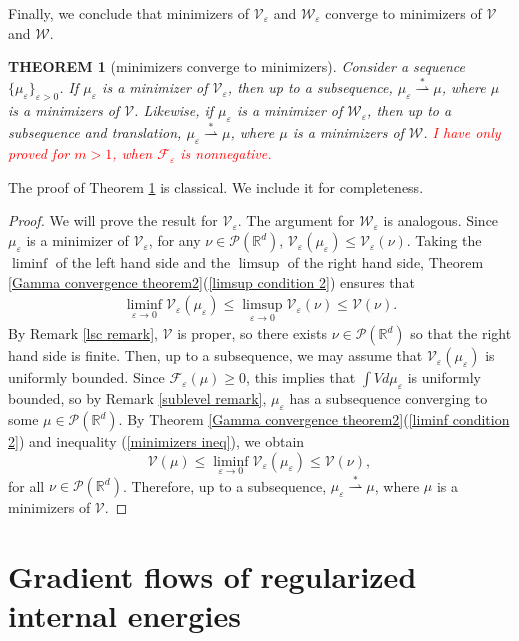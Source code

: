 \documentclass[11pt,leqno]{amsart}
\newtheorem{thm}{THEOREM}[section]
\theoremstyle{definition}
\newcommand{\Rd}{{\mathord{\mathbb R}^d}}
\newcommand{\wsto}{\stackrel{*}{\rightharpoonup}}
\newcommand{\F}{\mathcal{F}}
\def\P{{\mathcal P}}
\def\e{\varepsilon}
\def\F{\mathcal{F}}
\begin{document}
Finally, we conclude that minimizers of $\mathcal{V}_\e$ and $\mathcal{W}_\e$ converge to minimizers of $\mathcal{V}$ and $\mathcal{W}$.

\begin{thm}[minimizers converge to minimizers] \label{minimizers converge theorem}
Consider a sequence $\{ \mu_\e\}_{\e >0}$. If $ \mu_\e$ is a minimizer of $\mathcal{V}_\e$, then up to a subsequence, $\mu_\e \wsto \mu$, where $\mu$ is a minimizers of $\mathcal{V}$. Likewise, if $\mu_\e$ is a minimizer of $\mathcal{W}_\e$, then up to a subsequence and translation, $\mu_\e \wsto \mu$, where $\mu$ is a minimizers of $\mathcal{W}$. \textcolor{red}{I have only proved for $m>1$, when $\F_\e$ is nonnegative.}
\end{thm}
 
 The proof of Theorem \ref{minimizers converge theorem} is classical. We include it for completeness.

\begin{proof}
We will prove the result for $\mathcal{V}_\e$. The argument for $\mathcal{W}_\e$ is analogous. Since $\mu_\e$ is a minimizer of $\mathcal{V}_\e$, for any $\nu \in \P(\Rd)$, $\mathcal{V}_\e(\mu_\e) \leq \mathcal{V}_\e(\nu)$. Taking the $\liminf$ of the left hand side and the $\limsup$ of the right hand side, Theorem \ref{Gamma convergence theorem2}(\ref{limsup condition 2}) ensures that 
\begin{align} \label{minimizers ineq}
 \liminf_{\e \to 0} \mathcal{V}_\e(\mu_\e) \leq \limsup_{\e \to 0} \mathcal{V}_\e(\nu) \leq \mathcal{V}(\nu) . 
 \end{align}
By Remark \ref{lsc remark}, $\mathcal{V}$ is proper, so there exists $\nu \in \P(\Rd)$ so that the right hand side is finite. Then, up to a subsequence, we may assume that $ \mathcal{V}_\e(\mu_\e)$ is uniformly bounded. Since $\F_\e(\mu) \geq 0$, this implies that $\int V d \mu_\e$ is uniformly bounded, so by Remark \ref{sublevel remark}, $\mu_\e$ has a subsequence converging to some $\mu \in \P(\Rd)$. By Theorem \ref{Gamma convergence theorem2}(\ref{liminf condition 2}) and inequality (\ref{minimizers ineq}), we obtain
\[ \mathcal{V}(\mu) \leq  \liminf_{\e \to 0} \mathcal{V}_\e(\mu_\e) \leq \mathcal{V}(\nu) ,
\]
for all $\nu \in \P(\Rd)$. Therefore, up to a subsequence, $\mu_\e \wsto \mu$, where $\mu$ is a minimizers of $\mathcal{V}$.
\end{proof}


\section{Gradient flows of regularized internal energies}
\end{document}
